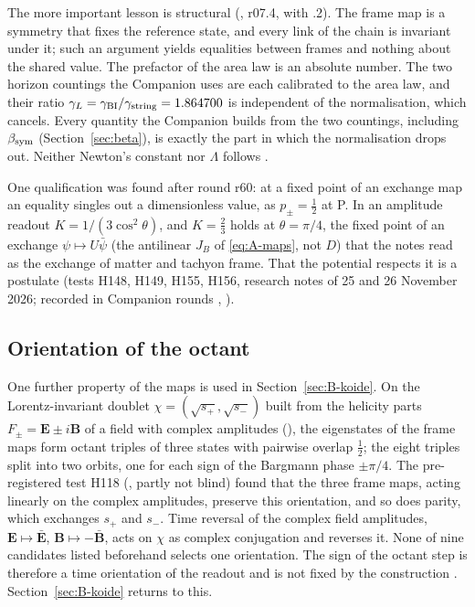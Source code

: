 The more important lesson is structural (, r07.4, with .2). The frame map is a symmetry that fixes the
reference state, and every link of the chain is invariant under it; such an argument yields equalities
between frames and nothing about the shared value. The prefactor of the area law is an absolute number.
The two horizon countings the Companion uses are each calibrated to the area law, and their ratio
$\gamma_L=\gamma_{\rm BI}/\gamma_{\rm string}=1.864700$ is independent of the normalisation, which cancels.
Every quantity the Companion builds from the two countings, including $\beta_{\mathrm{sym}}$ (Section~\ref{sec:beta}), is exactly the
part in which the normalisation drops out. Neither Newton's constant nor $\Lambda$ follows
\Established.

One qualification was found after round r60: at a fixed point of an exchange map an equality singles out a dimensionless
value, as $p_\pm=\tfrac12$ at P. In an amplitude readout $K=1/(3\cos^2\theta)$, and $K=\tfrac23$ holds at $\theta=\pi/4$, the
fixed point of an exchange $\psi\mapsto U\bar\psi$ (the antilinear $J_B$ of \eqref{eq:A-maps}, not $D$) that the notes read as the
exchange of matter and tachyon frame. That the potential respects it is a postulate \Conditional{} (tests H148, H149, H155, H156,
research notes of 25 and 26 November 2026; recorded in Companion rounds , ).

\subsection{Orientation of the octant}
\label{sec:A-orientation}

One further property of the maps is used in Section~\ref{sec:B-koide}. On the Lorentz-invariant doublet
$\chi=(\sqrt{s_+},\sqrt{s_-})$ built from the helicity parts $F_\pm=\mathbf E\pm i\mathbf B$ of a field with
complex amplitudes (), the eigenstates of the frame maps form octant triples of three states with
pairwise overlap $\tfrac12$; the eight triples split into two orbits, one for each sign of the Bargmann phase
$\pm\pi/4$. The pre-registered test H118 (, partly not blind) found that the three frame maps, acting
linearly on the complex amplitudes, preserve this orientation, and so does parity, which exchanges $s_+$
and $s_-$. Time reversal of the complex field amplitudes, $\mathbf E\mapsto\bar{\mathbf E}$,
$\mathbf B\mapsto-\bar{\mathbf B}$, acts on $\chi$ as complex conjugation and reverses it. None of nine candidates listed beforehand
selects one orientation. The sign of the octant step is therefore a time orientation of the readout and is
not fixed by the construction \Open. Section~\ref{sec:B-koide} returns to this.

